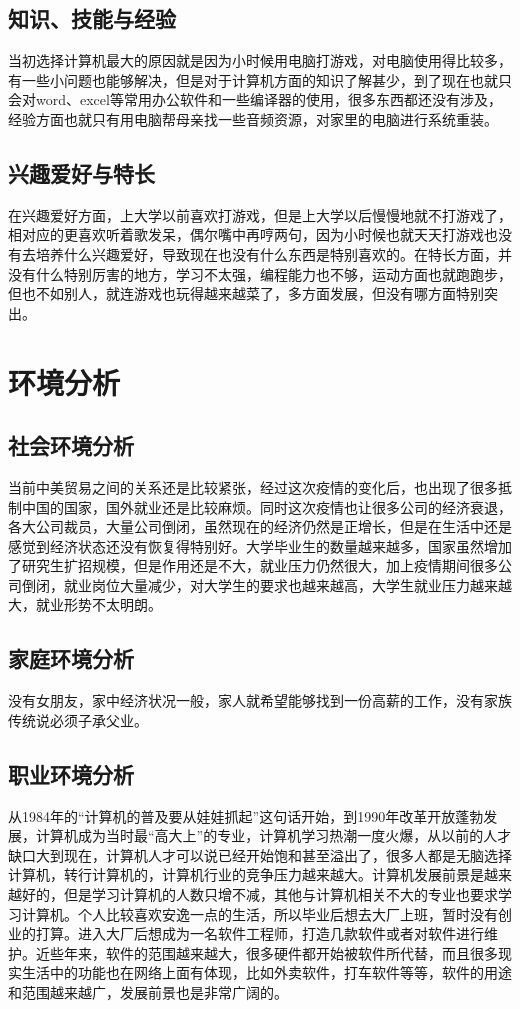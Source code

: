 \documentclass{article}
\begin{document}
\subsection{知识、技能与经验}
当初选择计算机最大的原因就是因为小时候用电脑打游戏，对电脑使用得比较多，有一些小问题也能够解决，但是对于计算机方面的知识了解甚少，到了现在也就只会对word、excel等常用办公软件和一些编译器的使用，很多东西都还没有涉及，经验方面也就只有用电脑帮母亲找一些音频资源，对家里的电脑进行系统重装。
\subsection{兴趣爱好与特长}
在兴趣爱好方面，上大学以前喜欢打游戏，但是上大学以后慢慢地就不打游戏了，相对应的更喜欢听着歌发呆，偶尔嘴中再哼两句，因为小时候也就天天打游戏也没有去培养什么兴趣爱好，导致现在也没有什么东西是特别喜欢的。在特长方面，并没有什么特别厉害的地方，学习不太强，编程能力也不够，运动方面也就跑跑步，但也不如别人，就连游戏也玩得越来越菜了，多方面发展，但没有哪方面特别突出。
\section{环境分析}
\subsection{社会环境分析}
当前中美贸易之间的关系还是比较紧张，经过这次疫情的变化后，也出现了很多抵制中国的国家，国外就业还是比较麻烦。同时这次疫情也让很多公司的经济衰退，各大公司裁员，大量公司倒闭，虽然现在的经济仍然是正增长，但是在生活中还是感觉到经济状态还没有恢复得特别好。大学毕业生的数量越来越多，国家虽然增加了研究生扩招规模，但是作用还是不大，就业压力仍然很大，加上疫情期间很多公司倒闭，就业岗位大量减少，对大学生的要求也越来越高，大学生就业压力越来越大，就业形势不太明朗。
\subsection{家庭环境分析}
没有女朋友，家中经济状况一般，家人就希望能够找到一份高薪的工作，没有家族传统说必须子承父业。
\subsection{职业环境分析}
从1984年的“计算机的普及要从娃娃抓起”这句话开始，到1990年改革开放蓬勃发展，计算机成为当时最“高大上”的专业，计算机学习热潮一度火爆，从以前的人才缺口大到现在，计算机人才可以说已经开始饱和甚至溢出了，很多人都是无脑选择计算机，转行计算机的，计算机行业的竞争压力越来越大。计算机发展前景是越来越好的，但是学习计算机的人数只增不减，其他与计算机相关不大的专业也要求学习计算机。个人比较喜欢安逸一点的生活，所以毕业后想去大厂上班，暂时没有创业的打算。进入大厂后想成为一名软件工程师，打造几款软件或者对软件进行维护。近些年来，软件的范围越来越大，很多硬件都开始被软件所代替，而且很多现实生活中的功能也在网络上面有体现，比如外卖软件，打车软件等等，软件的用途和范围越来越广，发展前景也是非常广阔的。
\end{document}
